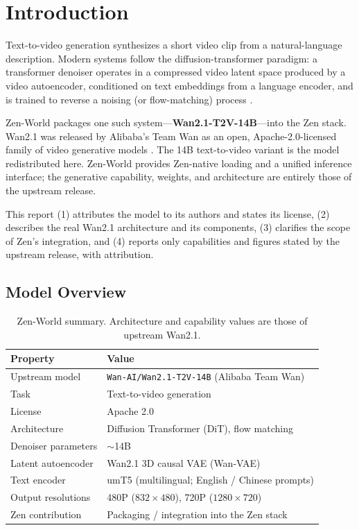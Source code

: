 \documentclass[11pt,a4paper]{article}
\begin{document}
\tableofcontents
\newpage

\section{Introduction}

Text-to-video generation synthesizes a short video clip from a natural-language description. Modern
systems follow the diffusion-transformer paradigm: a transformer denoiser operates in a compressed
video latent space produced by a video autoencoder, conditioned on text embeddings from a language
encoder, and is trained to reverse a noising (or flow-matching) process \cite{wan2025report}.

Zen-World packages one such system---\textbf{Wan2.1-T2V-14B}---into the Zen stack. Wan2.1 was
released by Alibaba's Team Wan as an open, Apache-2.0-licensed family of video generative models
\cite{wan2025report}. The 14B text-to-video variant is the model redistributed here. Zen-World
provides Zen-native loading and a unified inference interface; the generative capability, weights,
and architecture are entirely those of the upstream release.

This report (1) attributes the model to its authors and states its license, (2) describes the real
Wan2.1 architecture and its components, (3) clarifies the scope of Zen's integration, and
(4) reports only capabilities and figures stated by the upstream release, with attribution.

\subsection{Model Overview}

\begin{table}[H]
\centering
\begin{tabular}{ll}
\toprule
\textbf{Property} & \textbf{Value} \\
\midrule
Upstream model & \texttt{Wan-AI/Wan2.1-T2V-14B} (Alibaba Team Wan) \\
Task & Text-to-video generation \\
License & Apache 2.0 \\
Architecture & Diffusion Transformer (DiT), flow matching \\
Denoiser parameters & $\sim$14B \\
Latent autoencoder & Wan2.1 3D causal VAE (Wan-VAE) \\
Text encoder & umT5 (multilingual; English / Chinese prompts) \\
Output resolutions & 480P ($832\times480$), 720P ($1280\times720$) \\
Zen contribution & Packaging / integration into the Zen stack \\
\bottomrule
\end{tabular}
\caption{Zen-World summary. Architecture and capability values are those of upstream Wan2.1.}
\end{table}
\end{document}
